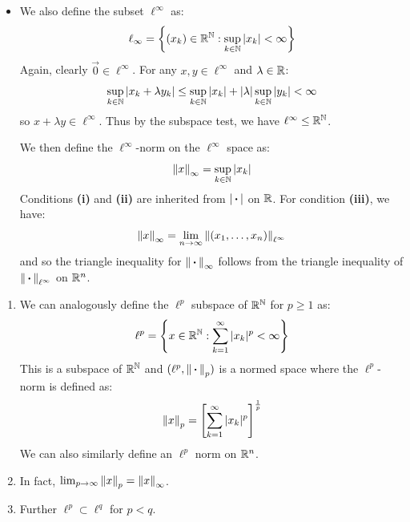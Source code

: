 \documentclass[../main.tex]{subfiles}
\begin{document}
\begin{example}
\begin{itemize}
      We then define the $\ell^2$-norm on the $\ell^2$ subspace as:
      \[
        \norm{x}_{2} = \left[\sum_{i = 1}^{\infty} x^2_i\right]^{\frac{1}{2}} \text{ for $x \in \ell^2$}
      \]
      Clearly conditions \textbf{(i)} and \textbf{(ii)} hold.
      For \textbf{(iii)}, we see that:
      \[
        \norm{x}_2 = \lim_{n \to \infty} \norm{(x_1, \ldots, x_n)}_{\ell^2}
      \]
      and so the triangle inequality for $\norm{\argdot}_2$ follows from the triangle inequality of $\norm{\argdot}_{\ell^2}$ on $\R^n$.
    \item We also define the subset $\ell^{\infty}$ as:
      \[
        \ell_{\infty} = \left\{(x_k) \in \mathbb{R}^{\mathbb{N}}: \sup_{k \in \mathbb{N}} |x_k| < \infty\right\}
      \]
      Again, clearly $\vec{0} \in \ell^{\infty}$.
      For any $x, y \in \ell^{\infty}$ and $\lambda \in \mathbb{R}$:
      \[
        \sup_{k \in \mathbb{N}} |x_k + \lambda y_k| \leq \sup_{k \in \mathbb{N}} |x_k| + |\lambda| \sup_{k \in \mathbb{N}} |y_k| < \infty
      \]
      so $x + \lambda y \in \ell^{\infty}$.
      Thus by the subspace test, we have $\ell^{\infty} \leq \mathbb{R}^{\mathbb{N}}$.

      We then define the $\ell^{\infty}$-norm on the $\ell^{\infty}$ space as:
      \[
        \left\lVert x \right\rVert_{\infty} = \sup_{k \in \mathbb{N}} |x_k|
      \]
      Conditions \textbf{(i)} and \textbf{(ii)} are inherited from $|{\hspace{0.18em}\boldsymbol{\cdot}\hspace{0.18em}}|$ on $\mathbb{R}$.
      For condition \textbf{(iii)}, we have:
      \[
        \left\lVert x \right\rVert_{\infty} = \lim_{n \to \infty} \left\lVert (x_1, \ldots, x_n) \right\rVert_{\ell^{\infty}}
      \]
      and so the triangle inequality for $\left\lVert {\hspace{0.18em}\boldsymbol{\cdot}\hspace{0.18em}} \right\rVert_{\infty}$ follows from the triangle inequality of $\left\lVert {\hspace{0.18em}\boldsymbol{\cdot}\hspace{0.18em}} \right\rVert_{\ell^{\infty}}$ on $\R^n$.
  \end{itemize}
\end{example}
\begin{remark}[Remarks]
  \begin{enumerate}
    \item We can analogously define the $\ell^p$ subspace of $\mathbb{R}^{\mathbb{N}}$ for $p \geq 1$ as:
      \[
        \ell^p = \left\{x \in \mathbb{R}^{\mathbb{N}}: \sum_{k = 1}^{\infty} |x_k|^p < \infty\right\}
      \]
      This is a subspace of $\mathbb{R}^{\mathbb{N}}$ and $(\ell^p, \left\lVert {\hspace{0.18em}\boldsymbol{\cdot}\hspace{0.18em}} \right\rVert_p)$ is a normed space where the $\ell^p$-norm is defined as:
      \[
        \left\lVert x \right\rVert_{p}  = \left[\sum_{k = 1}^{\infty} |x_k|^p\right]^\frac{1}{p}
      \]
      We can also similarly define an $\ell^p$ norm on $\R^n$.
    \item In fact, $\lim_{p \to \infty} \left\lVert x \right\rVert_{p} = \left\lVert x \right\rVert_{\infty}$.
    \item Further $\ell^p \subset \ell^q$ for $p < q$.
  \end{enumerate}
\end{remark}
\end{document}
